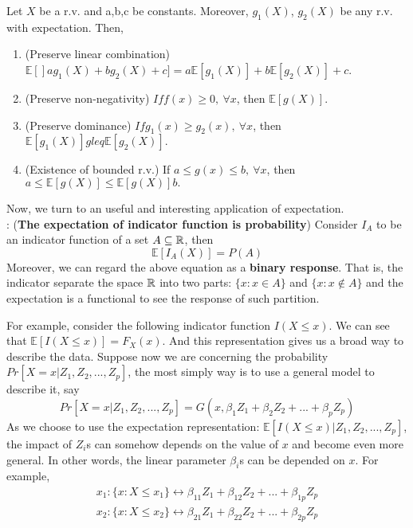 \documentclass[11pt]{article}
\begin{document}
\begin{property}
	Let $X$ be a r.v. and a,b,c be constants. Moreover, $g_1(X)$, $g_2(X)$ be any r.v. with expectation. Then,
	\begin{enumerate}
		\item (Preserve linear combination) $\mathbb{E}[]ag_1(X)+bg_2(X)+c]=a\mathbb{E}[g_1(X)] + b\mathbb{E}[g_2(X)] + c$.
		\item (Preserve non-negativity) $If f(x)\geq0,\ \forall x$, then $\mathbb{E}[g(X)]$.
		\item (Preserve dominance) $If g_1(x)\geq g_2(x),\ \forall x$, then $\mathbb{E}[g_1(X)]gleq\mathbb{E}[g_2(X)].$
		\item (Existence of bounded r.v.) If $a\leq g(x) \leq b,\ \forall x$, then $a\leq \mathbb{E}[g(X)]\leq\mathbb{E}[g(X)] b.$
	\end{enumerate}
\end{property}

Now, we turn to an useful and interesting application of expectation.\\

: ({\bf The expectation of indicator function is probability})
Consider $I_A$ to be an indicator function of a set $A\subseteq{\mathbb R}$, then
$$\mathbb{E}[I_A(X)] = P(A)$$
Moreover, we can regard the above equation as a {\bf binary response}. That is, the indicator separate the space ${\mathbb R}$ into two parts: $\{x:x\in A\}$ and $\{x:x\notin A \}$ and the expectation is a functional to see the response of such partition.

For example, consider the following indicator function $I(X\leq x)$. We can see that $\mathbb{E}[I(X\leq x)] = F_X(x)$. And this representation gives us a broad way to describe the data. Suppose now we are concerning the probability $Pr[X=x|Z_1,Z_2,...,Z_p]$, the most simply way is to use a general model to describe it, say
$$Pr[X=x|Z_1,Z_2,...,Z_p] = G(x,\beta_1Z_1+\beta_2Z_2+...+\beta_pZ_p)$$
As we choose to use the expectation representation: $\mathbb{E}[I(X\leq x)|Z_1,Z_2,...,Z_p]$, the impact of $Z_i$s can somehow depends on the value of $x$ and become even more general. In other words, the linear parameter $\beta_i$s can be depended on $x$. For example,
\begin{align*}
x_1: \{x:X\leq x_1 \}\leftrightarrow \beta_{11}Z_1+\beta_{12}Z_2+...+\beta_{1p}Z_p\\
x_2: \{x:X\leq x_2 \}\leftrightarrow \beta_{21}Z_1+\beta_{22}Z_2+...+\beta_{2p}Z_p
\end{align*}
\end{document}

